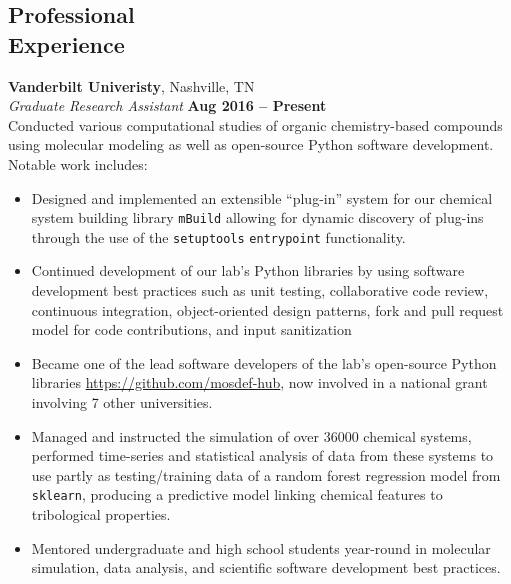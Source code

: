 \documentclass[margin,line]{resume}
\newcommand{\pkg}[1]{\texttt{#1}}
\begin{document}
\begin{resume}
    
    \section{\mysidestyle Professional\\Experience}

    \textbf{Vanderbilt Univeristy}, Nashville, TN \vspace{2mm}\\\vspace{1mm}%
    \textsl{Graduate Research Assistant} \hfill \textbf{Aug 2016 -- Present}\\
    Conducted various computational studies of organic chemistry-based compounds using molecular modeling as well as open-source Python software development. Notable work includes:

    \begin{itemize}[itemsep=0.5mm, parsep=2pt]
    \item Designed and implemented an extensible ``plug-in'' system for our chemical system building library \pkg{mBuild} allowing for dynamic discovery of plug-ins through the use of the \pkg{setuptools} \pkg{entrypoint} functionality.
    \item Continued development of our lab's Python libraries by using software development best practices such as unit testing, collaborative code review, continuous integration, object-oriented design patterns, fork and pull request model for code contributions, and input sanitization 
    \item Became one of the lead software developers of the lab's open-source Python libraries \url{https://github.com/mosdef-hub}, now involved in a national grant involving 7 other universities.
    \item Managed and instructed the simulation of over \num{36000} chemical systems, performed time-series and statistical analysis of data from these systems to use partly as testing/training data of a random forest regression model from \pkg{sklearn}, producing a predictive model linking chemical features to tribological properties.
    \item Mentored undergraduate and high school students year-round in molecular simulation, data analysis, and scientific software development best practices.
    \end{itemize}



\end{resume}
\end{document}
